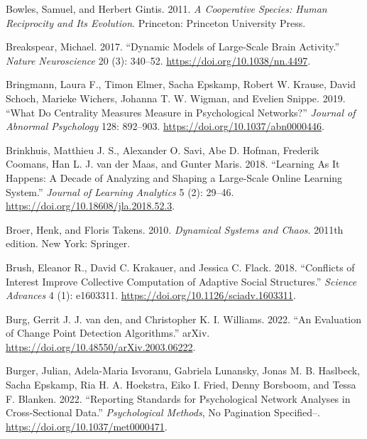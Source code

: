 \documentclass[
  letterpaper,
]{scrbook}
\newlength{\cslhangindent}
\newlength{\cslentryspacingunit} %
\newenvironment{CSLReferences}[2] %
 {%
  \setlength{\parindent}{0pt}
  \ifodd #1
  \let\oldpar\par
  \def\par{\hangindent=\cslhangindent\oldpar}
  \fi
  \setlength{\parskip}{#2\cslentryspacingunit}
 }%
 {}
\begin{document}
\begin{CSLReferences}{1}{0}
\leavevmode{}%
Bowles, Samuel, and Herbert Gintis. 2011. \emph{A Cooperative Species:
Human Reciprocity and Its Evolution}. {Princeton}: {Princeton University
Press}.

\leavevmode{}%
Breakspear, Michael. 2017. {``Dynamic Models of Large-Scale Brain
Activity.''} \emph{Nature Neuroscience} 20 (3): 340--52.
\url{https://doi.org/10.1038/nn.4497}.

\leavevmode{}%
Bringmann, Laura F., Timon Elmer, Sacha Epskamp, Robert W. Krause, David
Schoch, Marieke Wichers, Johanna T. W. Wigman, and Evelien Snippe. 2019.
{``What Do Centrality Measures Measure in Psychological Networks?''}
\emph{Journal of Abnormal Psychology} 128: 892--903.
\url{https://doi.org/10.1037/abn0000446}.

\leavevmode{}%
Brinkhuis, Matthieu J. S., Alexander O. Savi, Abe D. Hofman, Frederik
Coomans, Han L. J. van der Maas, and Gunter Maris. 2018. {``Learning {As
It Happens}: {A Decade} of {Analyzing} and {Shaping} a {Large-Scale
Online Learning System}.''} \emph{Journal of Learning Analytics} 5 (2):
29--46. \url{https://doi.org/10.18608/jla.2018.52.3}.

\leavevmode{}%
Broer, Henk, and Floris Takens. 2010. \emph{Dynamical Systems and
Chaos}. 2011th edition. New York: Springer.

\leavevmode{}%
Brush, Eleanor R., David C. Krakauer, and Jessica C. Flack. 2018.
{``Conflicts of Interest Improve Collective Computation of Adaptive
Social Structures.''} \emph{Science Advances} 4 (1): e1603311.
\url{https://doi.org/10.1126/sciadv.1603311}.

\leavevmode{}%
Burg, Gerrit J. J. van den, and Christopher K. I. Williams. 2022. {``An
{Evaluation} of {Change Point Detection Algorithms}.''} {arXiv}.
\url{https://doi.org/10.48550/arXiv.2003.06222}.

\leavevmode{}%
Burger, Julian, Adela-Maria Isvoranu, Gabriela Lunansky, Jonas M. B.
Haslbeck, Sacha Epskamp, Ria H. A. Hoekstra, Eiko I. Fried, Denny
Borsboom, and Tessa F. Blanken. 2022. {``Reporting Standards for
Psychological Network Analyses in Cross-Sectional Data.''}
\emph{Psychological Methods}, No Pagination Specified--.
\url{https://doi.org/10.1037/met0000471}.


\end{CSLReferences}
\end{document}
